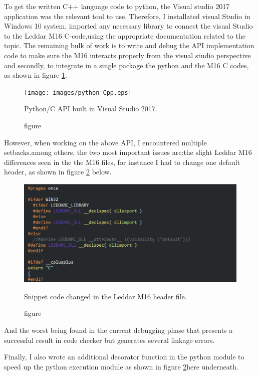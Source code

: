 \documentclass[onecolumn, draftclsnofoot,10pt, compsoc]{IEEEtran}
\begin{document}
To get the written C++ language code to python, the Visual studio 2017 application was the relevant tool to use. Therefore, I installated  visual Studio in Windows 10 system, imported any necessary library to connect the visual Studio  to the Leddar M16 C-code,using the appropriate \cite{Microsoft} documentation related to the topic. 
The remaining bulk of work is  to write and debug the API implementation code to make sure the M16 interacts properly from the visual studio perspective and secondly, to integrate in a single package the python and the M16 C codes, as shown in figure \ref{python-Cpp}.

 \begin{figure}[H]
			\texttt{[image: images/python-Cpp.eps]}
			\caption{figure}{Python/C API built in Visual Studio 2017.}
			\label{python-Cpp}
		\end{figure}
		
		
However, when working on the  above API, I encountered multiple setbacks.among others, the two most important issues are:the slight Leddar M16  differences seen in the the M16 files, for instance I had to change one default header, as shown in figure \ref{change-M16} below.

 \begin{figure}[H]
 \centering
			\includegraphics[scale=0.5]{images/change-M16.eps}
			\caption{figure}{Snippet code changed in the Leddar M16 header file.}
			\label{change-M16}
		\end{figure}

And the worst being found in the current debugging phase that presents a successful result in code checker but generates several linkage errors.  

Finally, I also wrote an additional decorator function in the python module to speed up the python execution module as shown in figure \ref{change-M16}here underneath.
\end{document}
